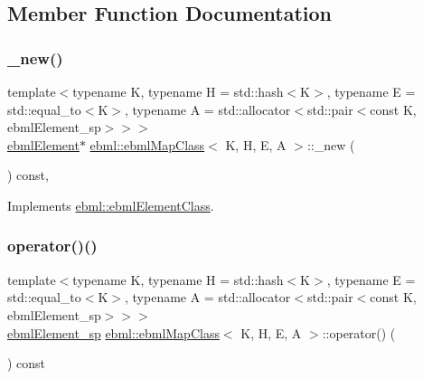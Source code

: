 \subsection{Member Function Documentation}
\mbox{\label{classebml_1_1ebmlMapClass_a3370b9b3457982693c08723af7d5130a}} 
\subsubsection{\texorpdfstring{\+\_\+new()}{\_new()}}
{\footnotesize\ttfamily template$<$typename K, typename H = std\+::hash$<$\+K$>$, typename E = std\+::equal\+\_\+to$<$\+K$>$, typename A = std\+::allocator$<$std\+::pair$<$const K, ebml\+Element\+\_\+sp$>$$>$$>$ \\
\mbox{\hyperlink{classebml_1_1ebmlElement}{ebml\+Element}}$\ast$ \mbox{\hyperlink{classebml_1_1ebmlMapClass}{ebml\+::ebml\+Map\+Class}}$<$ K, H, E, A $>$\+::\+\_\+new (\begin{DoxyParamCaption}{ }\end{DoxyParamCaption}) const\hspace{0.3cm}{\ttfamily [protected]}, {\ttfamily [virtual]}}



Implements \mbox{\hyperlink{classebml_1_1ebmlElementClass_a223ede6b8bc3c85251d2d73f0256fb45}{ebml\+::ebml\+Element\+Class}}.

\mbox{\label{classebml_1_1ebmlMapClass_a92f0ffcbc555bdb6cbef10454a192640}} 
\subsubsection{\texorpdfstring{operator()()}{operator()()}\hspace{0.1cm}{\footnotesize\ttfamily [1/12]}}
{\footnotesize\ttfamily template$<$typename K, typename H = std\+::hash$<$\+K$>$, typename E = std\+::equal\+\_\+to$<$\+K$>$, typename A = std\+::allocator$<$std\+::pair$<$const K, ebml\+Element\+\_\+sp$>$$>$$>$ \\
\mbox{\hyperlink{namespaceebml_adad533b7705a16bb360fe56380c5e7be}{ebml\+Element\+\_\+sp}} \mbox{\hyperlink{classebml_1_1ebmlMapClass}{ebml\+::ebml\+Map\+Class}}$<$ K, H, E, A $>$\+::operator() (\begin{DoxyParamCaption}{ }\end{DoxyParamCaption}) const}

